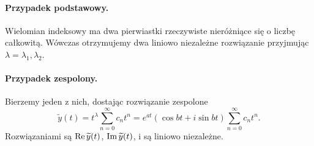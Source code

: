 \paragraph{Przypadek podstawowy.} Wielomian indeksowy ma dwa pierwiastki rzeczywiste nieróżniące się o liczbę 
całkowitą. Wówczas otrzymujemy dwa liniowo niezależne rozwiązanie przyjmując $\lambda = \lambda_1, \lambda_2$.
%
\paragraph{Przypadek zespolony.} Bierzemy jeden z nich, dostając rozwiązanie zespolone
%
\begin{equation*}
  \widetilde{y}(t) = t^{\lambda} \sum_{n=0}^{\infty} c_n t^n = e^{at} (\cos bt + i \sin bt) \sum_{n=0}^{\infty} c_n t^n.
\end{equation*}
%
Rozwiązaniami są $\operatorname{Re} \widetilde{y}(t)$, $\operatorname{Im} \widetilde{y}(t)$, i są liniowo niezależne.
%
